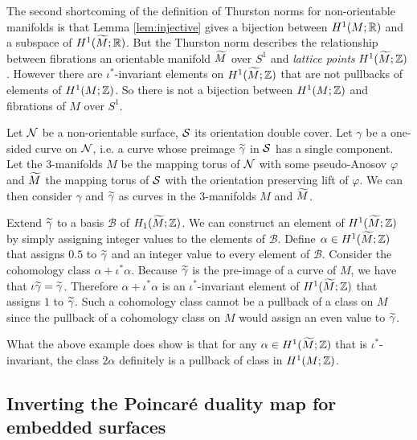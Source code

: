 The second shortcoming of the definition of Thurston norms for non-orientable manifolds is that Lemma \ref{lem:injective} gives a bijection between $H^1(M;\mathbb{R})$ and a subspace of $H^1(\widetilde{M};\mathbb{R})$.  But the Thurston norm describes the relationship between fibrations an orientable manifold $\widetilde{M}$ over $S^1$ and {\it lattice points} $H^1(\widetilde{M}; \mathbb{Z})$. %
However there are $\iota^{\ast}$-invariant
elements on $H^1(\widetilde{M}; \mathbb{Z})$ that are not pullbacks of elements of $H^1(M; \mathbb{Z})$.  So there is not a bijection between $H^1(M; \mathbb{Z})$ and fibrations of $M$ over $S^1$.

  Let $\mathcal{N}$ be a non-orientable surface, $\mathcal{S}$ its orientation double cover. Let $\gamma$ be a one-sided curve
  on $\mathcal{N}$, i.e. a curve whose preimage $\widetilde{\gamma}$ in $\mathcal{S}$ has a single component. Let the $3$-manifolds $M$ be the mapping torus of $\mathcal{N}$ with some pseudo-Anosov $\varphi$ and $\widetilde{M}$ the mapping torus of $\mathcal{S}$ with the orientation preserving lift of $\varphi$.  We can then
  consider $\gamma$ and $\widetilde{\gamma}$ as curves in the $3$-manifolds $M$ and $\widetilde{M}$.

  Extend $\widetilde{\gamma}$ to a basis $\mathcal{B}$ of $H_1(\widetilde{M}; \mathbb{Z})$. We can construct an element
  of $H^1(\widetilde{M}; \mathbb{Z})$ by simply assigning integer values to the elements of $\mathcal{B}$. Define $\alpha\in H^1(\widetilde{M};\mathbb{Z})$
  that assigns $0.5$ to $\widetilde{\gamma}$ and an integer value to every element of $\mathcal{B}$. Consider the
  cohomology class $\alpha + \iota^{\ast}\alpha$. Because $\widetilde{\gamma}$ is the pre-image of a curve of $M$, we have that $\iota \widetilde{\gamma} = \widetilde{\gamma}$. Therefore  $\alpha + \iota^{\ast}\alpha$ is an
  $\iota^{\ast}$-invariant element of $H^1(\widetilde{M}; \mathbb{Z})$ that assigns $1$ to $\widetilde{\gamma}$. Such a cohomology
  class cannot be a pullback of a class on $M$ since the pullback of a cohomology class on $M$ would assign an
  even value to $\widetilde{\gamma}$.

What the above example does show is that for any $\alpha\in H^1(\widetilde{M}; \mathbb{Z})$ that is  $\iota^{\ast}$-invariant, the class $2\alpha$ definitely is a pullback of class in $H^1(M; \mathbb{Z})$.

\subsection{Inverting the Poincar\'e duality map for embedded surfaces}
\label{sec:invert-poincare}


